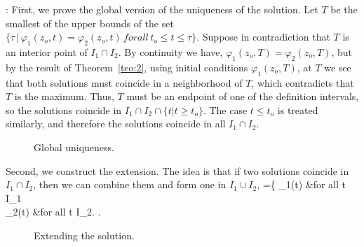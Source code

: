 \pru:
First, we prove the global version of the uniqueness of the solution.
Let $T$ be the smallest of the upper bounds of the set 
$\{\tau\, |\, \varphi_1(z_o,t) = \varphi_2(z_o,t) \,
for all \, t_o \le t \le \tau \}$.
Suppose in contradiction that $T$ is an interior point of 
$I_1 \cap I_2 $. 
By continuity we have,
$\varphi_1(z_o,T) = \varphi_2(z_o,T) $, but by the result of
Theorem~\ref{teo:2}, using initial conditions
$\varphi_1(z_o,T)$, at $ T$
we see that both solutions must 
coincide in a neighborhood of $T$, which contradicts that $T$ is the maximum.
Thus, $T$ must be an endpoint of one of the definition intervals, so the solutions coincide in 
$I_1 \cap I_2 \cap \{t | t \geq t_o\} $. 
The case $t \leq t_o $ is treated similarly, and therefore the
solutions coincide in all $I_1 \cap I_2 $. 

\begin{figure}[htbp]
  \begin{center}
    \caption{Global uniqueness.}
    \label{fig:4_4}
  \end{center}
\end{figure}

Second, we construct the extension. The idea is that if two solutions coincide in $I_1 \cap I_2 $, then we can combine them and form one
in $I_1 \cup I_2 $, 
\beq 
\fit =\left\{   \fip_1(t) &for all t \in I_1\\
           \fip_2(t) &for all t \in I_2. 
         \earr\right.
\eeq

\begin{figure}[htbp]
  \begin{center}
    \caption{Extending the solution.}
    \label{fig:4_5}
  \end{center}
\end{figure}

